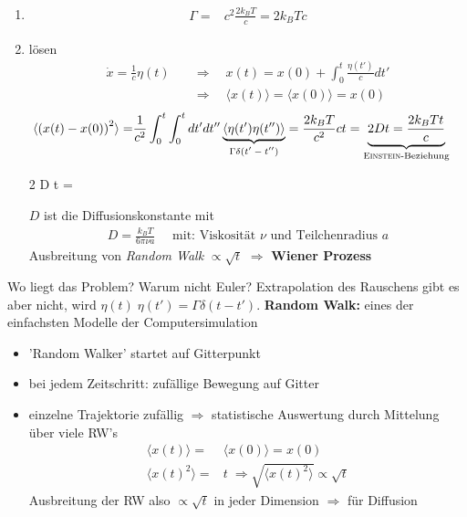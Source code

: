 \documentclass[12pt]{article}
\begin{document}
\begin{enumerate} 
\item
\begin{align}
\Gamma =& c^2 \frac{2 k_B T}{c} = 2 k_B T c
\end{align}
\item lösen \begin{align*}
\dot{x}= \frac{1}{c} \eta (t) \quad &\Rightarrow \quad x(t) = x(0) + \int_0^t \frac{\eta (t')}{c} dt'  \\
& \Rightarrow \quad \langle x(t) \rangle = \langle x(0) \rangle = x(0) 
\end{align*}
\begin{align*}
\langle \left(x(t) - x(0) \right)^2 \rangle =& \frac{1}{c^2} \int_0^t \int_0^t dt' dt'' \underbrace{\langle \eta (t') \eta (t'') \rangle}_\text{$ \Gamma \delta (t' - t'')$} = \frac{2 k_B T}{c^2} c t = \underbrace{2 D t = \frac{2 k_B T t}{c}}_\text{\textsc{Einstein}-Beziehung}
\end{align*}
\begin{tcolorbox}[ams align, title= Einstein-Beziehung , colback=blue!10!white, colframe=blue!30!black] 
2 D t = 
\end{tcolorbox}
$D$ ist die Diffusionskonstante mit \begin{align*}
D= \frac{k_B T}{6 \pi \nu a} \quad \mbox{ mit: Viskosität } \nu \mbox{ und Teilchenradius } a
\end{align*}
Ausbreitung von \textit{Random Walk} $\propto \sqrt{t}$ $\Rightarrow$ \textbf{Wiener Prozess}  \\
\end{enumerate}
Wo liegt das Problem? Warum nicht Euler?
Extrapolation des Rauschens gibt es aber nicht, wird $\eta (t) \; \eta(t') = \Gamma \delta (t-t')$. 
\textbf{Random Walk:} eines der einfachsten Modelle der Computersimulation
\begin{itemize}
\item 'Random Walker' startet auf Gitterpunkt
\item bei jedem Zeitschritt: zufällige Bewegung auf Gitter
\item einzelne Trajektorie zufällig $\Rightarrow$ statistische Auswertung durch Mittelung über viele RW's
\begin{align*}
\langle x(t) \rangle =& \langle x(0) \rangle = x(0) \\
\langle x(t)^2 \rangle = & t \; \Rightarrow \sqrt{\langle x(t)^2 \rangle} \propto \sqrt{t}
\end{align*}
Ausbreitung der RW also $\propto \sqrt{t}$ in jeder Dimension $\Rightarrow$ für Diffusion
\end{itemize}
\end{document}
